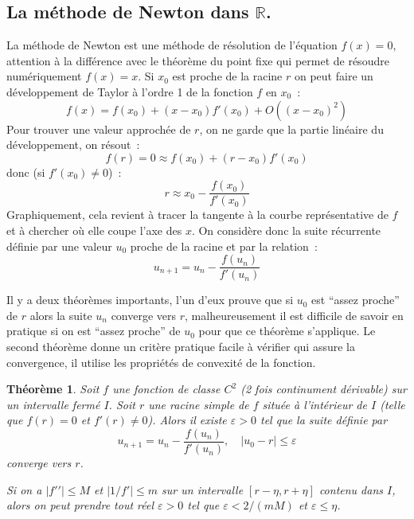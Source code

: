\documentclass[a4paper,11pt]{article}
\newtheorem{thm}{Théorème}
\newcommand{\R}{{\mathbb{R}}}
\begin{document}
\begin{giacjshere}
\subsection{La méthode de Newton dans $\R$.}
La méthode de Newton est une méthode de résolution de l'équation
$f(x)=0$, attention à la différence avec le théorème du point fixe
qui permet de résoudre numériquement $f(x)=x$.
Si $x_0$ est proche de la racine $r$
on peut faire un développement de Taylor à l'ordre 1 de la
fonction $f$ en $x_0$~:
\[ f(x)=f(x_0)+(x-x_0)f'(x_0)+O((x-x_0)^2) \]
Pour trouver une valeur approchée de $r$, on ne garde que la partie
linéaire du développement, on résout~:
\[ f(r)=0 \approx f(x_0) + (r-x_0) f'(x_0) \]
donc (si $f'(x_0)\neq 0$)~:
\[ r \approx x_0 -\frac{f(x_0)}{f'(x_0)}\]
Graphiquement, cela revient à tracer la tangente à la courbe représentative
de $f$ et à chercher où elle coupe l'axe des $x$.
On considère donc la suite récurrente définie par une valeur $u_0$
proche de la racine et par la relation~:
\[ u_{n+1} = u_n -\frac{f(u_n)}{f'(u_n)}\]

Il y a deux théorèmes importants, l'un d'eux prouve que
si $u_0$ est ``assez proche'' de $r$ alors la suite $u_n$ converge vers $r$,
malheureusement il est difficile de savoir en pratique si on est 
``assez proche'' de $u_0$ pour que ce théorème s'applique. Le second
théorème donne un critère pratique facile à vérifier qui assure
la convergence, il utilise les propriétés de convexité de la fonction.

\begin{thm} 
Soit $f$ une fonction de classe $C^2$ (2 fois continument dérivable)
sur un intervalle ferm\'e $I$. Soit $r$ une racine simple de $f$
situ\'ee \`a l'int\'erieur de $I$
(telle que $f(r)=0$ et $f'(r)\neq 0$). Alors il existe $\varepsilon>0$
tel que la suite définie par
\[ u_{n+1} = u_n -\frac{f(u_n)}{f'(u_n)}, \quad |u_0-r| \leq \varepsilon \]
converge vers $r$.

Si on a $|f'{'}| \leq M$ et $|1/f'| \leq m$ sur un intervalle 
$[r-\eta,r+\eta]$ contenu dans $I$, alors on peut prendre tout r\'eel
$\varepsilon>0$ tel que $\varepsilon < 2/(mM)$ et $\varepsilon \leq \eta$.
\end{thm}


\end{giacjshere}
\end{document}
